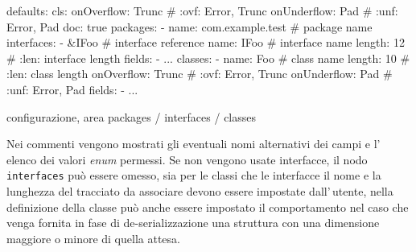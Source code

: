 \documentclass[a4paper,10pt]{report}
\newif\ifesource
\newenvironment{elisting}[1][!htb]
  {\captionsetup{aboveskip=0pt}\begin{listing}[#1]}
  {\end{listing}%
}
\begin{document}
\ifesource
\begin{figure*}[!htb]
\begin{lstlisting}[language=yaml, 
caption={configurazione, area packages / interfaces / classes}, 
label=lst:pakg-conf]
defaults:
  cls:
    onOverflow: Trunc   # :ovf: Error, Trunc
    onUnderflow: Pad    # :unf: Error, Pad
    doc: true
packages:
  - name: com.example.test  # package name
    interfaces:
      - &IFoo         (*\color{purple}{\# interface reference}*)
        name: IFoo    # interface name
        length: 12    # :len: interface length
        fields:
          - ...
    classes:
      - name: Foo           # class name
        length: 10          # :len: class length
        onOverflow: Trunc   # :ovf: Error, Trunc
        onUnderflow: Pad    # :unf: Error, Pad
        fields:
          - ...
\end{lstlisting}
\end{figure*}
\else
\begin{elisting}
\begin{yamlcode}
defaults:
  cls:
    onOverflow: Trunc   # :ovf: Error, Trunc
    onUnderflow: Pad    # :unf: Error, Pad
    doc: true
packages:
  - name: com.example.test  # package name
    interfaces:
      - &IFoo         # interface reference
        name: IFoo    # interface name
        length: 12    # :len: interface length
        fields:
          - ...
    classes:
      - name: Foo           # class name
        length: 10          # :len: class length
        onOverflow: Trunc   # :ovf: Error, Trunc
        onUnderflow: Pad    # :unf: Error, Pad
        fields:
          - ...
\end{yamlcode}
\caption{configurazione, area packages / interfaces / classes}
\label{lst:pakg-conf}
\end{elisting}
\fi
Nei commenti vengono mostrati gli eventuali nomi alternativi dei campi e 
l'\,elenco dei valori \textsl{enum} permessi.
Se non vengono usate interfacce, il nodo \texttt{interfaces} può essere omesso,
sia per le classi che le interfacce il nome e la lunghezza del tracciato da 
associare devono essere impostate dall'\,utente, nella definizione della classe
può anche essere impostato il comportamento nel caso che venga fornita in fase
di de-serializzazione una struttura con una dimensione maggiore o minore di 
quella attesa.
\end{document}
